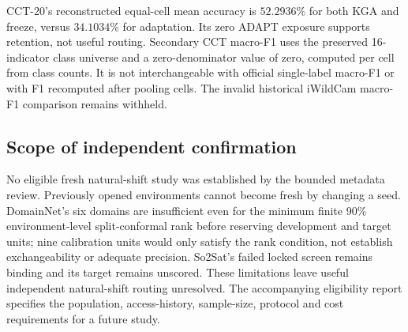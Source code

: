 CCT-20's reconstructed equal-cell mean accuracy is $52.2936\%$ for both KGA
and freeze, versus $34.1034\%$ for adaptation. Its zero ADAPT exposure supports
retention, not useful routing. Secondary CCT macro-F1 uses the preserved
16-indicator class universe and a zero-denominator value of zero, computed per
cell from class counts. It is not interchangeable with official single-label
macro-F1 or with F1 recomputed after pooling cells. The invalid historical
iWildCam macro-F1 comparison remains withheld.



\subsection{Scope of independent confirmation}
No eligible fresh natural-shift study was established by the bounded metadata
review. Previously opened environments cannot become fresh by changing a
seed. DomainNet's six domains are insufficient even for the minimum finite
90\% environment-level split-conformal rank before reserving development and
target units; nine calibration units would only satisfy the rank condition,
not establish exchangeability or adequate precision. So2Sat's failed locked
screen remains binding and its target remains unscored. These limitations
leave useful independent natural-shift routing unresolved. The accompanying
eligibility report specifies the population, access-history, sample-size,
protocol and cost requirements for a future study.
